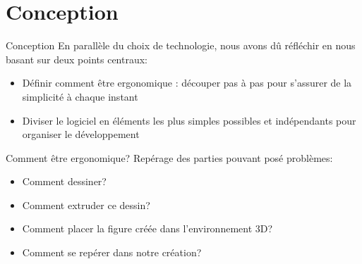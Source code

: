 \documentclass[a4paper,10pt]{beamer}
\begin{document}
	\section{Conception}	
		\begin{frame}{Conception}
	 		En parallèle du choix de technologie, nous avons dû réfléchir en nous basant sur deux points centraux:
		
			\begin{itemize}
				  \item Définir comment être ergonomique : découper pas à pas pour s'assurer de la simplicité à chaque instant
				  \item Diviser le logiciel en éléments les plus simples possibles et indépendants pour organiser le développement
			\end{itemize}
		\end{frame}
		
		
		\begin{frame}{Comment être ergonomique?}
				Repérage des parties pouvant posé problèmes:
				
				\begin{itemize}
					\item Comment dessiner?
					\item Comment extruder ce dessin?
					\item Comment placer la figure créée dans l'environnement 3D?
					\item Comment se repérer dans notre création?
				\end{itemize}
		\end{frame}	
		
\end{document}
